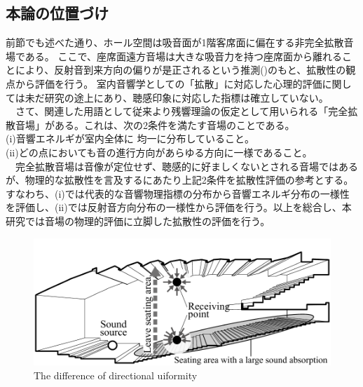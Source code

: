 \addtocounter{footnote}{1}
\addtocounter{footnote}{1}
\addtocounter{footnote}{1}

\pagebreak
\subsection{本論の位置づけ}
前節でも述べた通り、ホール空間は吸音面が1階客席面に偏在する非完全拡散音場である。
ここで、座席面遠方音場は大きな吸音力を持つ座席面から離れることにより、反射音到来方向の偏りが是正されるという推測()のもと、拡散性の観点から評価を行う。
室内音響学としての「拡散」に対応した心理的評価に関しては未だ研究の途上にあり、聴感印象に対応した指標は確立していない。
\\　さて、関連した用語として従来より残響理論の仮定として用いられる「完全拡散音場」がある。これは、次の2条件を満たす音場のことである。
\\(i)音響エネルギが室内全体に 均一に分布していること。
\\(i\hspace{-.05em}i)どの点においても音の進行方向があらゆる方向に一様であること。
\\　完全拡散音場は音像が定位せず、聴感的に好ましくないとされる音場ではあるが、物理的な拡散性を言及するにあたり上記2条件を拡散性評価の参考とする。すなわち、(i)では代表的な音響物理指標の分布から音響エネルギ分布の一様性を評価し、(ii)では反射音方向分布の一様性から評価を行う。以上を総合し、本研究では音場の物理的評価に立脚した拡散性の評価を行う。
\vspace{0.8cm}
\begin{figure}[htbp]
    \centering
    \includegraphics[keepaspectratio,scale=0.8]{01_att/far_improve.pdf}
    \caption{\hspace{1mm}The difference of directional uiformity}
    \label{fig:far_improve}
\end{figure}


